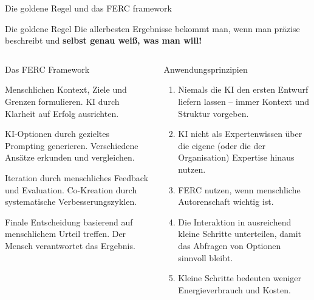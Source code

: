 \documentclass[aspectratio=\BeamerAspectRatio]{beamer}
\begin{document}
\begin{frame}{Die goldene Regel und das FERC framework}
    \footnotesize  
    \begin{myalert}{Die goldene Regel}
        Die allerbesten Ergebnisse bekommt man, wenn man präzise beschreibt und \textbf{selbst genau weiß, was man will!}
    \end{myalert}
    \vspace{-0.7em}
    \begin{columns}[T]
        \begin{mynote}{Das FERC Framework \cite{ferc}}
            \begin{description}[Explore]
                \item[Frame] Menschlichen Kontext, Ziele und Grenzen formulieren. KI durch Klarheit auf Erfolg ausrichten.
                \item[Explore] KI-Optionen durch gezieltes Prompting generieren. Verschiedene Ansätze erkunden und vergleichen.
                \item[Refine] Iteration durch menschliches Feedback und Evaluation. Co-Kreation durch systematische Verbesserungszyklen.
                \item[Commit] Finale Entscheidung basierend auf menschlichem Urteil treffen. Der Mensch verantwortet das Ergebnis.
            \end{description}
        \end{mynote}
        
        \begin{mynote}{Anwendungsprinzipien}
            \begin{enumerate}
                \item Niemals die KI den ersten Entwurf liefern lassen -- immer Kontext und Struktur vorgeben.
                \item KI nicht als Expertenwissen über die eigene (oder die der Organisation) Expertise hinaus nutzen.
                \item FERC nutzen, wenn menschliche Autorenschaft wichtig ist.
                \item Die Interaktion in ausreichend kleine Schritte unterteilen, damit das Abfragen von Optionen sinnvoll bleibt.
                \item Kleine Schritte bedeuten weniger Energieverbrauch und Kosten.
            \end{enumerate}
        \end{mynote}
    \end{columns}
\end{frame}
\end{document}
